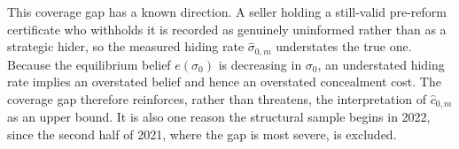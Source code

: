This coverage gap has a known direction. A seller holding a still-valid pre-reform certificate who
withholds it is recorded as genuinely uninformed rather than as a strategic hider, so the measured
hiding rate $\hat\sigma_{0,m}$ understates the true one. Because the equilibrium belief
$e(\sigma_0)$ is decreasing in $\sigma_0$, an understated hiding rate implies an overstated belief
and hence an overstated concealment cost. The coverage gap therefore reinforces, rather than
threatens, the interpretation of $\hat c_{0,m}$ as an upper bound. It is also one reason the
structural sample begins in 2022, since the second half of 2021, where the gap is most severe, is
excluded.
